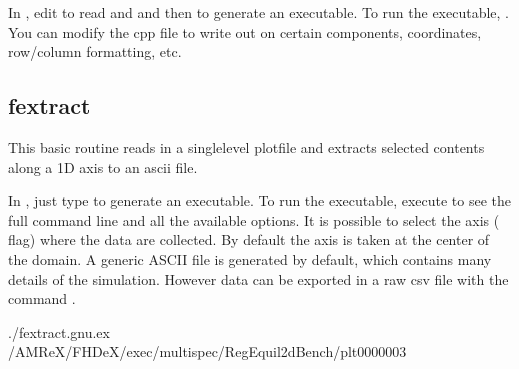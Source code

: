 \documentclass[letterpaper,10pt,english]{sphinxmanual}
\begin{document}
\sphinxAtStartPar
In , edit  to read
 and  and then 
to generate an executable.  To run the executable, .
You can modify the cpp file to write out on certain components, coordinates,
row/column formatting, etc.

\begin{DUlineblock}{0em}
\item[] 
\end{DUlineblock}


\subsection{fextract}
\label{\detokenize{Post_Processing:fextract}}
\sphinxAtStartPar
This basic routine reads in a single\sphinxhyphen{}level plotfile and extracts selected contents
along a 1\sphinxhyphen{}D axis to an ascii file.

\sphinxAtStartPar
{}

\sphinxAtStartPar
In , just type  
to generate an executable.  To run the executable, execute  to see the full command line
and all the available options.
It is possible to select the axis ( flag) where the data are collected. By default the axis is taken at the center of the domain.
A generic ASCII file is generated by default, which contains many details of the simulation. However data can be exported in a raw csv file with the command .

\sphinxAtStartPar
{}

\begin{sphinxVerbatim}[commandchars=\\\{\}]
./fextract.gnu.ex 
\PYGZti{}/AMReX/FHDeX/exec/multispec/Reg\PYGZus{}Equil\PYGZus{}2d\PYGZus{}Bench/plt0000003

\end{sphinxVerbatim}
\end{document}
